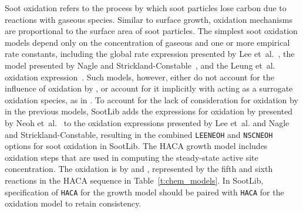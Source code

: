 \documentclass[preprint,letterpaper]{elsarticle}
\begin{document}
Soot oxidation refers to the process by which soot particles lose carbon due to reactions with gaseous species. Similar to surface growth, oxidation mechanisms are proportional to the surface area of soot particles.
The simplest soot oxidation models depend only on the concentration of gaseous  and one or more empirical rate constants, including the global rate expression presented by Lee et~al.~\cite{Lee_1962}, the model presented by Nagle and Strickland-Constable~\cite{Nagle_1962}, and the Leung et~al. oxidation expression~\cite{Leung_1991}.
Such models, however, either do not account for the influence of oxidation by , or account for it implicitly with  acting as a surrogate oxidation species, as in \cite{Leung_1991}. To account for the lack of consideration for oxidation by  in the previous models, SootLib adds the expressions for oxidation by  presented by Neoh et~al.~\cite{Neoh_1980,Neoh_1981} to the oxidation expressions presented by Lee et~al. and Nagle and Strickland-Constable, resulting in the combined \texttt{LEE\textunderscore NEOH} and \texttt{NSC\textunderscore NEOH} options for soot oxidation in SootLib.
The HACA growth model includes oxidation steps that are used in computing the steady-state active site concentration. The oxidation is by  and , represented by the fifth and sixth reactions in the HACA sequence in Table~\ref{t:chem_models}. In SootLib, specification of \texttt{HACA} for the growth model should be paired with \texttt{HACA} for the oxidation model to retain consistency. %

\end{document}
